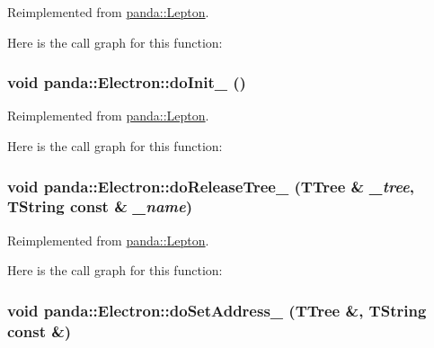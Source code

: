 Reimplemented from \hyperlink{classpanda_1_1Lepton_a90a170df4cd09d324964da724bcc5428}{panda::Lepton}.

Here is the call graph for this function:\hypertarget{classpanda_1_1Electron_a87826542cbfbde4305c312ffa677d1bf}{
\subsubsection[{doInit\_\-}]{\setlength{\rightskip}{0pt plus 5cm}void panda::Electron::doInit\_\- ()}}
\label{classpanda_1_1Electron_a87826542cbfbde4305c312ffa677d1bf}


Reimplemented from \hyperlink{classpanda_1_1Lepton_af764ff1ea6dfb16072d6c9de3b935129}{panda::Lepton}.

Here is the call graph for this function:\hypertarget{classpanda_1_1Electron_a728ea4bc877ba68f1a8e7301ea712871}{
\subsubsection[{doReleaseTree\_\-}]{\setlength{\rightskip}{0pt plus 5cm}void panda::Electron::doReleaseTree\_\- (TTree \& {\em \_\-tree}, \/  TString const \& {\em \_\-name})}}
\label{classpanda_1_1Electron_a728ea4bc877ba68f1a8e7301ea712871}


Reimplemented from \hyperlink{classpanda_1_1Lepton_ae0f913947dcc9e3827de846e7b885280}{panda::Lepton}.

Here is the call graph for this function:\hypertarget{classpanda_1_1Electron_a4da89a6071eab568e7aba8b61d2888a2}{
\subsubsection[{doSetAddress\_\-}]{\setlength{\rightskip}{0pt plus 5cm}void panda::Electron::doSetAddress\_\- (TTree \&, \/  TString const \&)}}
\label{classpanda_1_1Electron_a4da89a6071eab568e7aba8b61d2888a2}


